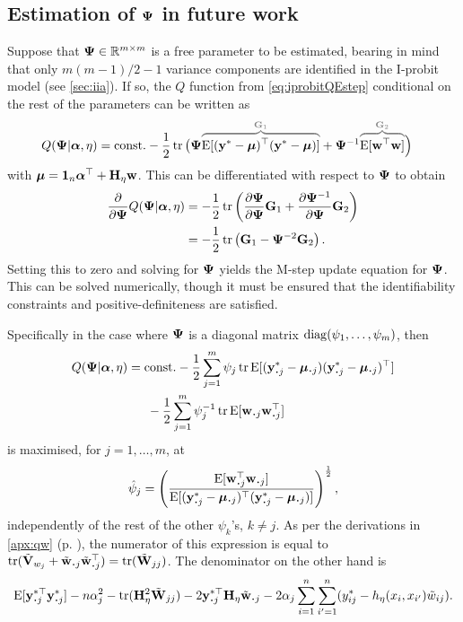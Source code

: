 \subsection{Estimation of \texorpdfstring{${\bm\Psi}$}{$\Psi$} in future work}
\label{sec:difficultPsi}

Suppose that ${\bm\Psi} \in \mathbb{R}^{m\times m}$ is a free parameter to be estimated, bearing in mind that only $m(m-1)/2 - 1$ variance components are identified in the I-probit model (see \cref{sec:iia}).
If so, the $Q$ function from \cref{eq:iprobitQEstep} conditional on the rest of the parameters can be written as
\vspace{-1.3em}
\begin{align*}
  Q(\bPsi|\balpha,\eta)
  &= \const 
  -\half \tr 
  \big( 
  \bPsi
  \greyoverbrace{\E[(\by^* - \bmu)^\top (\by^* - \bmu)]}{\bG_1}
  +
  \bPsi^{-1}
  \greyoverbrace{\E[\bw^\top\bw]}{\bG_2} 
  \Big)
\end{align*}
with ${\bm\mu} = {\mathbf 1}_n{\bm\alpha}^\top + {\mathbf H}_\eta{\mathbf w}$.
This can be differentiated with respect to ${\bm\Psi}$ to obtain
\begin{align*}
  \frac{\partial}{\partial{\bm\Psi}}Q({\bm\Psi}|{\bm\alpha},\eta)
  &= -\frac{1}{2} \operatorname{tr} \left(\frac{\partial{\bm\Psi}}{\partial{\bm\Psi}}{\mathbf G}_1 + \frac{\partial{\bm\Psi}^{-1}}{\partial{\bm\Psi}}{\mathbf G}_2 \right) \\
  &= -\frac{1}{2} \operatorname{tr} \left({\mathbf G}_1 - {\bm\Psi}^{-2} {\mathbf G}_2 \right). 
\end{align*}
Setting this to zero and solving for ${\bm\Psi}$ yields the M-step update equation for ${\bm\Psi}$. 
This can be solved numerically, though it must be ensured that the identifiability constraints and positive-definiteness are satisfied.

Specifically in the case where ${\bm\Psi}$ is a diagonal matrix $\operatorname{diag}(\psi_1,\dots,\psi_m)$, then
\begin{align*}
  \vspace{-0.5em}
  Q(\bPsi|\balpha,\eta)
  &= \const -\half \sum_{j=1}^m \psi_j \tr
  \E[(\by^*_{\bigcdot j} - \bmu_{\bigcdot j})(\by^*_{\bigcdot j} - \bmu_{\bigcdot j})^\top] \\
  &\phantom{==} -\half \sum_{j=1}^m \psi_j^{-1} \tr
  \E[\bw_{\bigcdot j}\bw_{\bigcdot j}^\top] 
  \vspace{-1em}
\end{align*}
is maximised, for $j=1,\dots,m$, at
\[
  \hat\psi_j = \left( 
  \frac{\E[ \bw_{\bigcdot j}^\top\bw_{\bigcdot j} ] }{\E[ (\by^*_{\bigcdot j} - \bmu_{\bigcdot j})^\top (\by^*_{\bigcdot j} - \bmu_{\bigcdot j}) ]}
  \right)^{\half},
\] 
independently of the rest of the other $\psi_k$'s, $k\neq j$.
As per the derivations in \cref{apx:qw} (p. \pageref{eq:trCEwDw}), the numerator of this expression is equal to $\tr(\tilde\bV_{w_j} + \tilde\bw_{\bigcdot j}\tilde\bw_{\bigcdot j}^\top) = \tr (\tilde\bW_{jj})$.
The denominator on the other hand is
\[
  \E[\by_{\bigcdot j}^{*\top}\by_{\bigcdot j}^*] - 
  n\alpha_j^2 - \tr( \bH_\eta^2 \tilde\bW_{jj}) 
  - 2\by^{*\top}_{\bigcdot j}\bH_\eta\tilde\bw_{\bigcdot j}
  - 2\alpha_j \sum_{i=1}^n\sum_{i'=1}^n (y_{ij}^* - h_\eta(x_{i},x_{i'}) \tilde w_{ij}).
\]

